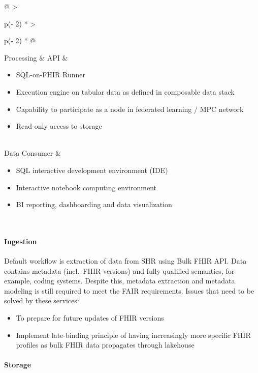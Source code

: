 \documentclass[
  authoryear]{elsarticle}
\let\oldparagraph\paragraph
\renewcommand{\paragraph}[1]{\oldparagraph{#1}\mbox{}}
\providecommand{\tightlist}{%
  \setlength{\itemsep}{0pt}\setlength{\parskip}{0pt}}\usepackage{longtable,booktabs,array}
\begin{document}
\begin{longtable}[]{@{}
  >{\raggedright\arraybackslash}p{(\columnwidth - 2\tabcolsep) * }
  >{\raggedright\arraybackslash}p{(\columnwidth - 2\tabcolsep) * }@{}}
Processing \& API & \begin{minipage}[t]{\linewidth}\raggedright
\begin{itemize}
\tightlist
\item
  SQL-on-FHIR Runner
\item
  Execution engine on tabular data as defined in composable data stack
\item
  Capability to participate as a node in federated learning / MPC
  network
\item
  Read-only access to storage
\end{itemize}
\end{minipage} \\
Data Consumer & \begin{minipage}[t]{\linewidth}\raggedright
\begin{itemize}
\tightlist
\item
  SQL interactive development environment (IDE)
\item
  Interactive notebook computing environment \citep{granger2021jupyter}
\item
  BI reporting, dashboarding and data visualization
\end{itemize}
\end{minipage} \\
\end{longtable}

\paragraph{Ingestion}\label{ingestion}

Default workflow is extraction of data from SHR using Bulk FHIR API.
Data contains metadata (incl.~FHIR versions) and fully qualified
semantics, for example, coding systems. Despite this, metadata
extraction and metadata modeling is still required to meet the FAIR
requirements. Issues that need to be solved by these services:

\begin{itemize}
\tightlist
\item
  To prepare for future updates of FHIR versions
\item
  Implement late-binding principle of having increasingly more specific
  FHIR profiles as bulk FHIR data propagates through lakehouse
\end{itemize}

\paragraph{Storage}\label{storage}
\end{document}
